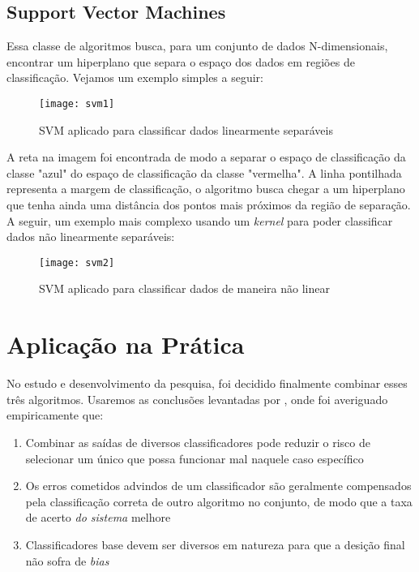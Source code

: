 \subsection{Support Vector Machines}

Essa classe de algoritmos busca, para um conjunto de dados N-dimensionais, encontrar um hiperplano que separa o espaço dos dados em regiões de classificação. Vejamos um exemplo simples a seguir:


\begin{figure}[H]
	\centering
	\caption{SVM aplicado para classificar dados linearmente separáveis}
  \texttt{[image: svm1]}
\label{fig:svm1}  

\end{figure}



A reta na imagem foi encontrada de modo a separar o espaço de classificação da classe "azul" do espaço de classificação da classe "vermelha". A linha pontilhada representa a margem de classificação, o algoritmo busca chegar a um hiperplano que tenha ainda uma distância dos pontos mais próximos da região de separação. A seguir, um exemplo mais complexo usando um \textit{kernel}  para poder classificar dados não linearmente separáveis:

\begin{figure}[H]
	\centering
	\caption{SVM aplicado para classificar dados de maneira não linear}
  \texttt{[image: svm2]}
\label{fig:svm2}  

\end{figure}

\section{Aplicação na Prática}

No estudo e desenvolvimento da pesquisa, foi decidido finalmente combinar esses três algoritmos. Usaremos as conclusões levantadas por \cite{comparativeEN}, onde foi averiguado empiricamente que: 

\begin{enumerate}
\item Combinar as saídas de diversos classificadores pode reduzir o risco de selecionar um único que possa funcionar mal naquele caso específico
\item Os erros cometidos advindos de um classificador são geralmente compensados pela classificação correta de outro algoritmo no conjunto, de modo que a taxa de acerto \textit{do sistema} melhore
\item Classificadores base devem ser diversos em natureza para que a desição final não sofra de \textit{bias}
\end{enumerate}



